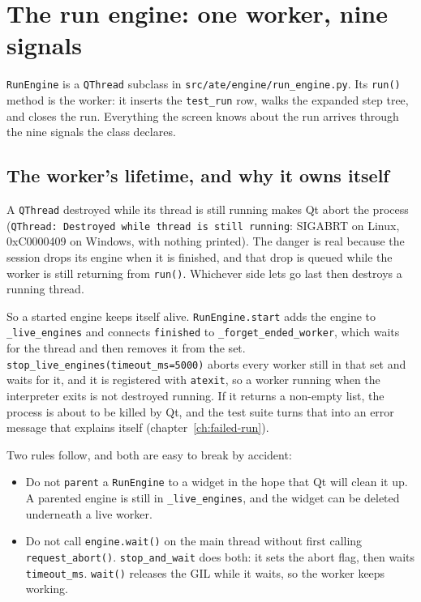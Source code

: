 \chapter{The run engine: one worker, nine signals}\label{ch:engine}

\texttt{RunEngine} is a \texttt{QThread} subclass in
\texttt{src/\allowbreak{}ate/\allowbreak{}engine/\allowbreak{}run\_\allowbreak{}engine.py}. Its \texttt{run()} method is the worker: it inserts the
\texttt{test\_run} row, walks the expanded step tree, and closes the run. Everything the screen knows
about the run arrives through the nine signals the class declares.

\section{The worker's lifetime, and why it owns itself}

A \texttt{QThread} destroyed while its thread is still running makes Qt abort the process
(\texttt{QThread: Destroyed while thread is still running}: SIGABRT on Linux, 0xC0000409 on Windows,
with nothing printed). The danger is real because the session drops its engine when it is finished,
and that drop is queued while the worker is still returning from \texttt{run()}. Whichever side lets go
last then destroys a running thread.

So a started engine keeps itself alive. \texttt{RunEngine.start} adds the engine to
\texttt{\_live\_engines} and connects \texttt{finished} to \texttt{\_\allowbreak{}forget\_\allowbreak{}ended\_\allowbreak{}worker}, which
waits for the thread and then removes it from the set. \texttt{stop\_\allowbreak{}live\_\allowbreak{}engines(timeout\_\allowbreak{}ms=5000)}
aborts every worker still in that set and waits for it, and it is registered with \texttt{atexit}, so a
worker running when the interpreter exits is not destroyed running. If it returns a non-empty list, the
process is about to be killed by Qt, and the test suite turns that into an error message that explains
itself (chapter~\ref{ch:failed-run}).

Two rules follow, and both are easy to break by accident:

\begin{itemize}
  \item Do not \texttt{parent} a \texttt{RunEngine} to a widget in the hope that Qt will clean it up.
    A parented engine is still in \texttt{\_live\_engines}, and the widget can be deleted underneath a
    live worker.
  \item Do not call \texttt{engine.wait()} on the main thread without first calling
    \texttt{request\_abort()}. \texttt{stop\_and\_wait} does both: it sets the abort flag, then waits
    \texttt{timeout\_ms}. \texttt{wait()} releases the GIL while it waits, so the worker keeps working.
\end{itemize}

